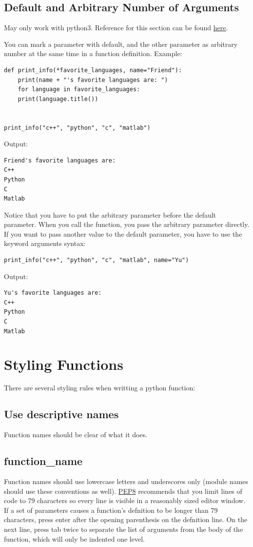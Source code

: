 \documentclass[12pt]{book}
\begin{document}
\subsection{Default and Arbitrary Number of Arguments}
\label{sec:org6cd8ed6}
May only work with python3. Reference for this section can be found \href{https://stackoverflow.com/questions/46446960/how-to-use-default-values-and-arbitrary-arguments-at-one-function-call-in-python}{here}.

You can mark a parameter with default, and the other parameter as arbitrary number at the same time in a function definition. Example:
\begin{verbatim}
def print_info(*favorite_languages, name="Friend"):
    print(name + "'s favorite languages are: ")
    for language in favorite_languages:
	print(language.title())


print_info("c++", "python", "c", "matlab")
\end{verbatim}
Output:
\begin{verbatim}
Friend's favorite languages are: 
C++
Python
C
Matlab
\end{verbatim}
Notice that you have to put the arbitrary parameter before the default parameter. When you call the function, you pass the arbitrary parameter directly. If you want to pass another value to the default parameter, you have to use the keyword arguments syntax:
\begin{verbatim}
print_info("c++", "python", "c", "matlab", name="Yu")
\end{verbatim}
Output:
\begin{verbatim}
Yu's favorite languages are: 
C++
Python
C
Matlab
\end{verbatim}

\section{Styling Functions}
\label{sec:org91eef65}
There are several styling rules when writting a python function:

\subsection{Use descriptive names}
\label{sec:orga95ddad}
Function names should be clear of what it does.

\subsection{function\_name}
\label{sec:org1bad7a3}
Function names should use lowercase letters and underscores only (module names should use these conventions as well). \href{https://www.python.org/dev/peps/pep-0008/}{PEP8} recommends that you limit lines of code to 79 characters so every line is visible in a reasonably sized editor window. If a set of parameters causes a function’s defnition to be longer than 79 characters, press enter after the opening parenthesis on the defnition line. On the next line, press tab twice to separate the list of arguments from the body of the function, which will only be indented one level.
\end{document}
